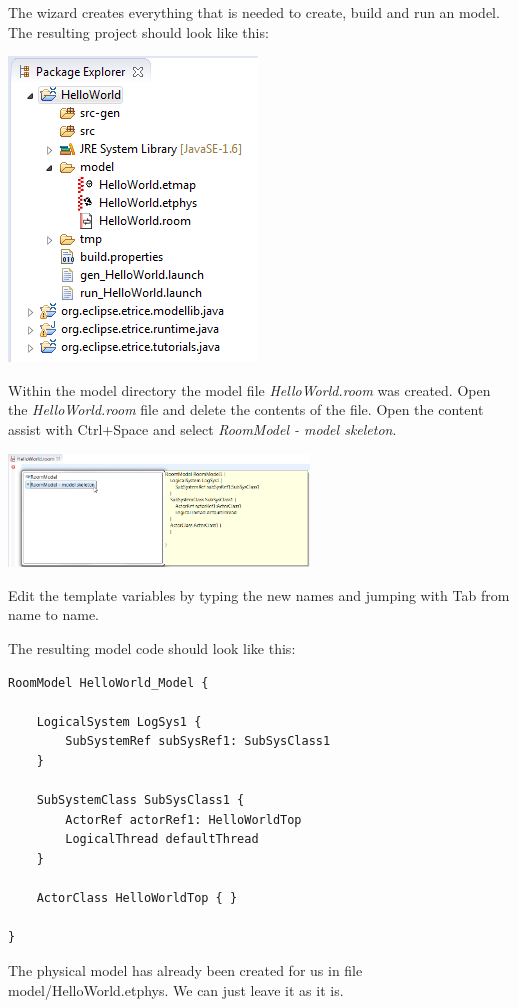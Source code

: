 The wizard creates everything that is needed to create, build and run an \eTrice{} model. The resulting 
project should look like this:

\includegraphics{images/015-HelloWorld11.png}

Within the model directory the model file \emph{HelloWorld.room} was created. Open the 
\emph{HelloWorld.room} file and delete the contents of the file. Open the content assist with Ctrl+Space 
and select \emph{RoomModel - model skeleton}.

\includegraphics[width=0.6\textwidth]{images/015-HelloWorld12.png}

Edit the template variables by typing the new names and jumping with Tab from name to name.

The resulting model code should look like this:

\begin{lstlisting}[language=ROOM]
RoomModel HelloWorld_Model {

	LogicalSystem LogSys1 {
		SubSystemRef subSysRef1: SubSysClass1
	}

	SubSystemClass SubSysClass1 {
		ActorRef actorRef1: HelloWorldTop
		LogicalThread defaultThread
	}

	ActorClass HelloWorldTop { }

}
\end{lstlisting}

The physical model has already been created for us in file model/HelloWorld.etphys.
We can just leave it as it is.

